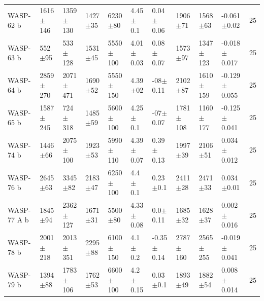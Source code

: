 \begin{subappendices}
{\begin{landscape}
\begin{longtable}{lllllllllll}
WASP-62 b   &    1616$\pm$146 &    1359$\pm$130 &   1427$\pm$35 &    6230$\pm$80 &   4.45$\pm$0.1 &   0.04$\pm$0.06 &        1906$\pm$71 &        1568$\pm$63 &   -0.061$\pm$0.02 &                25 \\
WASP-63 b   &      552$\pm$95 &     533$\pm$128 &   1531$\pm$45 &   5550$\pm$100 &  4.01$\pm$0.03 &   0.08$\pm$0.07 &        1573$\pm$97 &       1347$\pm$123 &  -0.018$\pm$0.017 &                25 \\
WASP-64 b   &    2859$\pm$270 &    2071$\pm$471 &   1690$\pm$52 &   5550$\pm$150 &  4.39$\pm$02 &  -08$\pm$0.11 &        2102$\pm$87 &       1610$\pm$159 &  -0.129$\pm$0.055 &                25 \\
WASP-65 b   &    1587$\pm$245 &     724$\pm$318 &   1485$\pm$59 &   5600$\pm$100 &   4.25$\pm$0.1 &  -07$\pm$0.07 &       1781$\pm$108 &       1160$\pm$177 &  -0.125$\pm$0.041 &                25 \\
WASP-74 b   &     1446$\pm$66 &    2075$\pm$100 &   1923$\pm$53 &   5990$\pm$110 &  4.39$\pm$0.07 &   0.39$\pm$0.13 &        1997$\pm$39 &        2106$\pm$51 &   0.034$\pm$0.012 &                25 \\
WASP-76 b   &     2645$\pm$63 &     3345$\pm$82 &   2183$\pm$47 &   6250$\pm$100 &    4.4$\pm$0.1 &    0.23$\pm$0.1 &        2411$\pm$28 &        2471$\pm$33 &    0.034$\pm$0.01 &                25 \\
WASP-77 A b &     1845$\pm$94 &    2362$\pm$127 &   1671$\pm$31 &    5500$\pm$80 &  4.33$\pm$0.08 &    0.0$\pm$0.11 &        1685$\pm$32 &        1628$\pm$37 &   0.002$\pm$0.016 &                25 \\
WASP-78 b   &    2001$\pm$218 &    2013$\pm$351 &   2295$\pm$88 &   6100$\pm$150 &    4.1$\pm$0.2 &  -0.35$\pm$0.14 &       2787$\pm$160 &       2565$\pm$255 &  -0.019$\pm$0.041 &                25 \\
WASP-79 b   &     1394$\pm$88 &    1783$\pm$106 &   1762$\pm$53 &   6600$\pm$100 &   4.2$\pm$0.15 &    0.03$\pm$0.1 &        1893$\pm$49 &        1882$\pm$54 &   0.008$\pm$0.014 &                25 \\

\end{longtable}
\end{landscape}}
\end{subappendices}
